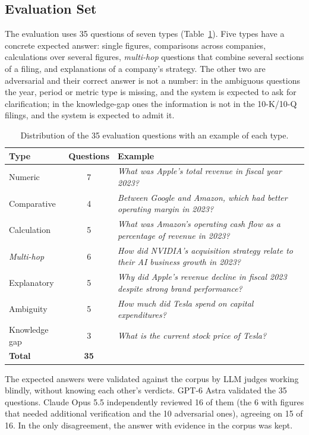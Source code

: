 \documentclass[conference]{IEEEtran}
\begin{document}
\subsection{Evaluation Set}
The evaluation uses 35 questions of seven types (Table~\ref{tab:preguntas}). Five types have a concrete expected answer: single figures, comparisons across companies, calculations over several figures, \textit{multi-hop} questions that combine several sections of a filing, and explanations of a company's strategy. The other two are adversarial and their correct answer is not a number: in the ambiguous questions the year, period or metric type is missing, and the system is expected to ask for clarification; in the knowledge-gap ones the information is not in the 10-K/10-Q filings, and the system is expected to admit it.

\begin{table}[t]
\centering
\small
\begin{tabular}{lcl}
\toprule
\textbf{Type} & \textbf{Questions} & \textbf{Example} \\
\midrule
Numeric & 7 & \textit{What was Apple's total revenue in fiscal year 2023?} \\
Comparative & 4 & \textit{Between Google and Amazon, which had better operating margin in 2023?} \\
Calculation & 5 & \textit{What was Amazon's operating cash flow as a percentage of revenue in 2023?} \\
\textit{Multi-hop} & 6 & \textit{How did NVIDIA's acquisition strategy relate to their AI business growth in 2023?} \\
Explanatory & 5 & \textit{Why did Apple's revenue decline in fiscal 2023 despite strong brand performance?} \\
Ambiguity & 5 & \textit{How much did Tesla spend on capital expenditures?} \\
Knowledge gap & 3 & \textit{What is the current stock price of Tesla?} \\
\midrule
\textbf{Total} & \textbf{35} & \\
\bottomrule
\end{tabular}
\caption{Distribution of the 35 evaluation questions with an example of each type.}
\label{tab:preguntas}
\end{table}

The expected answers were validated against the corpus by LLM judges working blindly, without knowing each other's verdicts. GPT-6 Astra validated the 35 questions. Claude Opus 5.5 independently reviewed 16 of them (the 6 with figures that needed additional verification and the 10 adversarial ones), agreeing on 15 of 16. In the only disagreement, the answer with evidence in the corpus was kept.
\end{document}
